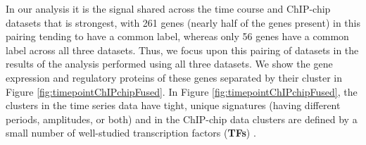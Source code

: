 \documentclass{bmcart}
\begin{document}
In our analysis it is the signal shared across the time course and ChIP-chip datasets that is strongest, with 261 genes (nearly half of the genes present) in this pairing tending to have a common label, whereas only 56 genes have a common label across all three datasets. Thus, we focus upon this pairing of datasets in the results of the analysis performed using all three datasets. 
We show the gene expression and regulatory proteins of these genes separated by their cluster in Figure \ref{fig:timepointChIPchipFused}. In Figure \ref{fig:timepointChIPchipFused}, the clusters in the time series data have tight, unique signatures  (having different periods, amplitudes, or both) and in the ChIP-chip data clusters are defined by a small number of well-studied transcription factors (\textbf{TFs}) \citep[see Table 2 of the Supplementary Material for details of these TFs, many of which are well known to regulate cell cycle expression,][]{simon2001serial}.

\end{document}
